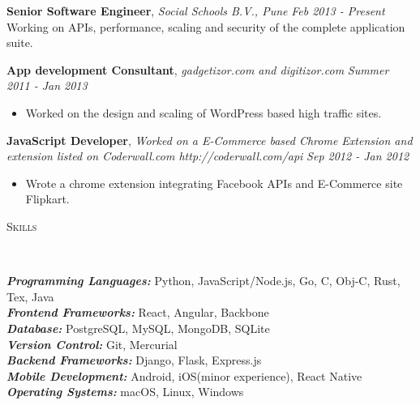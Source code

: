 \documentclass[9pt]{article}
\newenvironment{changemargin}[2]{%
  \begin{list}{}{%
    \setlength{\topsep}{0pt}%
    \setlength{\leftmargin}{#1}%
    \setlength{\rightmargin}{#2}%
    \setlength{\listparindent}{\parindent}%
    \setlength{\itemindent}{\parindent}%
    \setlength{\parsep}{\parskip}%
  }%
  \item[]}{\end{list}
}
\newcommand{\lineover}{
    \begin{changemargin}{-0.05in}{-0.05in}
        \vspace*{-8pt}
        \hrulefill \\
        \vspace*{-2pt}
    \end{changemargin}
}
\newcommand{\header}[1]{
    \begin{changemargin}{-0.5in}{-0.5in}
        \scshape{#1}\\
    \lineover
    \end{changemargin}
}
\newenvironment{body} {
    \vspace*{-16pt}
    \begin{changemargin}{-0.25in}{-0.5in}
  }
    {\end{changemargin}
}
\begin{document}
\begin{body}
    \vspace{14pt}
    \textbf{Senior Software Engineer}, \emph{Social Schools B.V., Pune} \hfill \emph{Feb 2013 - Present}\\
    Working on APIs, performance, scaling and security of the complete application suite.
    \vspace*{-4pt}

    \vspace{14pt}
    \textbf{App development Consultant}, \emph{gadgetizor.com and digitizor.com} \hfill \emph{Summer 2011 - Jan 2013}\\
    \vspace*{-4pt}
    \begin{itemize} \itemsep -0pt  %
        \item Worked on the design and scaling of WordPress based high traffic sites.
    \end{itemize}

    \textbf {JavaScript Developer}, \emph{Worked on a E-Commerce based Chrome Extension and extension listed on Coderwall.com http://coderwall.com/api} \hfill \emph{Sep 2012 - Jan 2012}\\
    \vspace*{-4pt}
    \begin{itemize} \itemsep -0pt
        \item Wrote a chrome extension integrating Facebook APIs and E-Commerce site Flipkart.
    \end{itemize}
\end{body}

\smallskip


\header{Skills}

\begin{body}
    \vspace{14pt}
    \emph{\textbf{Programming Languages:}}{} Python, JavaScript/Node.js, Go, C, Obj-C, Rust, Tex, Java\\
    \emph{\textbf{Frontend Frameworks:}}{} React, Angular, Backbone\\
    \emph{\textbf{Database:}}{} PostgreSQL, MySQL, MongoDB, SQLite\\
    \emph{\textbf{Version Control:}}{} Git, Mercurial\\
    \emph{\textbf{Backend Frameworks:}}{} Django, Flask, Express.js\\
    \emph{\textbf{Mobile Development:}}{} Android, iOS(minor experience), React Native\\
    \emph{\textbf{Operating Systems:}}{} macOS, Linux, Windows\\
\end{body}
\end{document}
